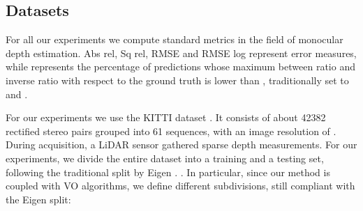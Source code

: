 \documentclass[10pt,twocolumn,letterpaper]{article}
\begin{document}
\begin{table*}[!htbp]
\centering
{}
\smallskip
\caption{Ablation experiments for VOMonodepth on KITTI \cite{kitti} odometry sequences from the Eigen split \cite{Eigen} (8691 frames).}
\label{table:ablation}
\end{table*}

\subsection{Datasets}

For all our experiments we compute standard metrics \cite{Eigen} in the field of monocular depth estimation. Abs rel, Sq rel, RMSE and RMSE log
represent error measures, while  represents the percentage of predictions whose maximum between ratio and inverse ratio with respect to the ground truth is lower than , traditionally set to  and .

For our experiments we use the KITTI dataset \cite{kitti}. It consists of about 42382 rectified stereo pairs grouped into 61 sequences, with an image resolution of . During acquisition, a LiDAR sensor gathered sparse depth measurements. For our experiments, we divide the entire dataset into a training and a testing set, following the traditional split by Eigen \etal. \cite{Eigen}. In particular, since our method is coupled with VO algorithms, we define different subdivisions, still compliant with the Eigen split:
\end{document}
